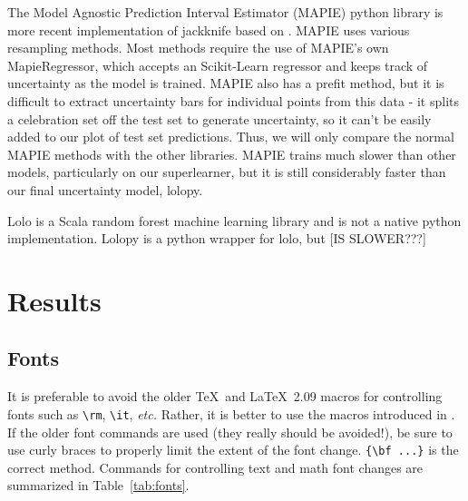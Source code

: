 \documentclass[twocolumn, nofootinbib, secnumarabic, amssymb, nobibnotes, aps, prd]{revtex4-2}
\newcommand{\macro}[1]{\texttt{\textbackslash#1}}
\newcommand{\m}[1]{\macro{#1}}
\begin{document}
The Model Agnostic Prediction Interval Estimator (MAPIE) python library is more recent implementation of jackknife based on \cite{Foygel2020}. MAPIE uses various resampling methods. Most methods require the use of MAPIE's own MapieRegressor, which accepts an Scikit-Learn regressor and keeps track of uncertainty as the model is trained. MAPIE also has a prefit method, but it is difficult to extract uncertainty bars for individual points from this data - it splits a celebration set off the test set to generate uncertainty, so it can't be easily added to our plot of test set predictions. Thus, we will only compare the normal MAPIE methods with the other libraries. MAPIE trains much slower than other models, particularly on our superlearner, but it is still considerably faster than our final uncertainty model, lolopy.

Lolo is a Scala random forest machine learning library and is not a native python implementation. Lolopy is a python wrapper for lolo, but [IS SLOWER???]

\section{Results}

\subsection{Fonts}
It is preferable to avoid the older \TeX\ and \LaTeX\ 2.09 macros for
controlling fonts such as \m{rm}, \m{it}, \textit{etc.} Rather, it is
better to use the macros introduced in \LaTeXe.  If the older font
commands are used (they really should be avoided!), be sure to use
curly braces to properly limit the extent of the font
change. \verb+{\bf ...}+ is the correct method.
Commands for controlling text and math font changes are summarized in
Table~\ref{tab:fonts}.





\end{document}
